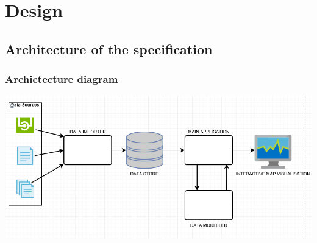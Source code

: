 
\chapter{Design} %

\label{Chapter4} %


\section{Architecture of the specification}

\subsection{Archictecture diagram}

\includegraphics[scale=0.75]{figures/Software_Architecture} %



